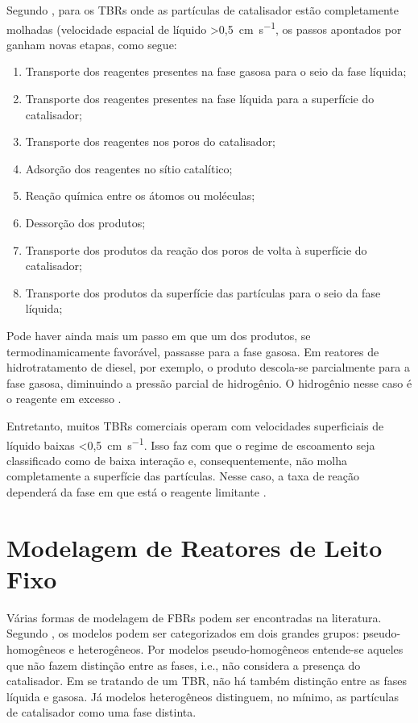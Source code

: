 Segundo , para os TBRs onde as
partículas de catalisador estão completamente molhadas (velocidade espacial de
líquido \SI{>0,5}{\centi\meter\per\s}, os passos apontados por
 ganham novas etapas, como segue:

\begin{enumerate}
\item Transporte dos reagentes presentes na fase gasosa para o seio da
fase líquida;
\item Transporte dos reagentes presentes na fase líquida para a superfície do
catalisador;
\item Transporte dos reagentes nos poros do catalisador;
\item Adsorção dos reagentes no sítio catalítico;
\item Reação química entre os átomos ou moléculas;
\item Dessorção dos produtos;
\item Transporte dos produtos da reação dos poros de volta à superfície do
catalisador;
\item Transporte dos produtos da superfície das partículas para o seio da fase
líquida;
\end{enumerate} 

Pode haver ainda mais um passo em que um dos produtos, se termodinamicamente
favorável, passasse para a fase gasosa. Em reatores de hidrotratamento de
diesel, por exemplo, o  produto descola-se parcialmente para a fase
gasosa, diminuindo a pressão parcial de hidrogênio. O hidrogênio nesse caso é
o reagente em excesso \cite{Ancheyta2011}.

Entretanto, muitos TBRs comerciais operam com velocidades superficiais de
líquido baixas \SI{<0,5}{\centi\meter\per\s}. Isso faz com que o regime de
escoamento seja classificado como de baixa interação e, consequentemente, não molha
completamente a superfície das partículas. Nesse caso, a taxa de reação
dependerá da fase em que está o reagente limitante \cite{Ranade2011}.

\section {Modelagem de Reatores de Leito Fixo} \label{sec:modelagemreatores}

Várias formas de modelagem de FBRs podem ser encontradas na literatura.
Segundo , os modelos podem ser categorizados em dois
grandes grupos: pseudo-homogêneos e heterogêneos. Por modelos pseudo-homogêneos
entende-se aqueles que não fazem distinção entre as fases, i.e., não considera a
presença do catalisador. Em se tratando de um TBR, não há também distinção entre
as fases líquida e gasosa. Já modelos heterogêneos distinguem, no mínimo, as
partículas de catalisador como uma fase distinta.

